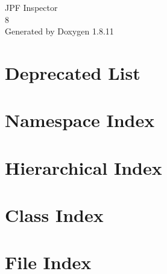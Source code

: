 \documentclass[twoside]{book}
\newcommand{\+}{\discretionary{\mbox{\scriptsize$\hookleftarrow$}}{}{}}
\newcommand{\clearemptydoublepage}{%
  \newpage{\pagestyle{empty}\cleardoublepage}%
}
\begin{document}
\hypersetup{pageanchor=false,
             bookmarksnumbered=true,
             pdfencoding=unicode
            }
\begin{titlepage}
\vspace*{7cm}
\begin{center}%
{\Large J\+PF Inspector \\[1ex]\large 8 }\\
\vspace*{1cm}
{\large Generated by Doxygen 1.8.11}\\
\end{center}
\end{titlepage}
\clearemptydoublepage
\tableofcontents
\clearemptydoublepage
{}
\hypersetup{pageanchor=true}

\chapter{Deprecated List}
\label{deprecated}
\hypertarget{deprecated}{}

\chapter{Namespace Index}

\chapter{Hierarchical Index}

\chapter{Class Index}

\chapter{File Index}

\end{document}

